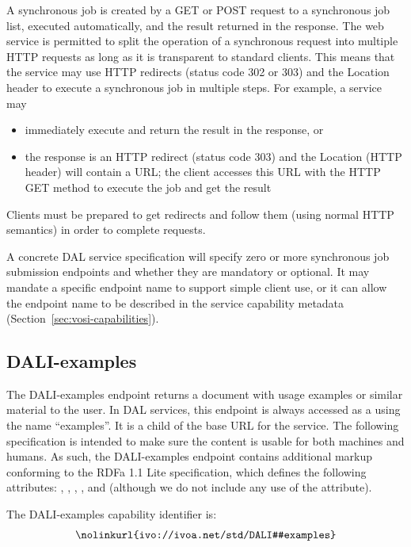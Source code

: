 \documentclass[11pt,letter]{ivoa}
\begin{document}
A synchronous job is created by a GET or POST request to a synchronous job list,
executed automatically, and the result returned in the response. The web service
is permitted to split the operation of a synchronous request into multiple HTTP
requests as long as it is transparent to standard clients. This means that the
service may use HTTP redirects (status code 302 or 303) and the Location header
to execute a synchronous job in multiple steps. For example, a service may

\begin{itemize}
\item immediately execute and return the result in the response, or
\item the response is an HTTP redirect (status code 303) and the Location (HTTP
header) will contain a URL; the client accesses this URL with the HTTP GET
method to execute the job and get the result
\end{itemize}

Clients must be prepared to get redirects and follow them (using normal HTTP
semantics) in order to complete requests.

A concrete DAL service specification will specify zero or more synchronous job
submission endpoints and whether they are mandatory or optional. It may mandate
a specific endpoint name to support simple client use, or it can allow the
endpoint name to be described in the service capability metadata
(Section~\ref{sec:vosi-capabilities}).

\subsection{DALI-examples}
\label{sec:dali-examples}
The DALI-examples endpoint returns a document with usage examples or similar
material to the user. In DAL services, this endpoint is always accessed as a
using the name ``examples''. It is a child of the base URL for the service. The
following specification is intended to make sure the content is usable for both
machines and humans. As such, the DALI-examples endpoint contains additional
markup conforming to the RDFa 1.1 Lite \citep{std:RDFaLite11} specification,
which defines the
following attributes: , , ,
, and  (although we
do not include any use of the  attribute).

The DALI-examples capability identifier is:
$$
\hbox{\nolinkurl{ivo://ivoa.net/std/DALI#examples}}
$$
\end{document}
